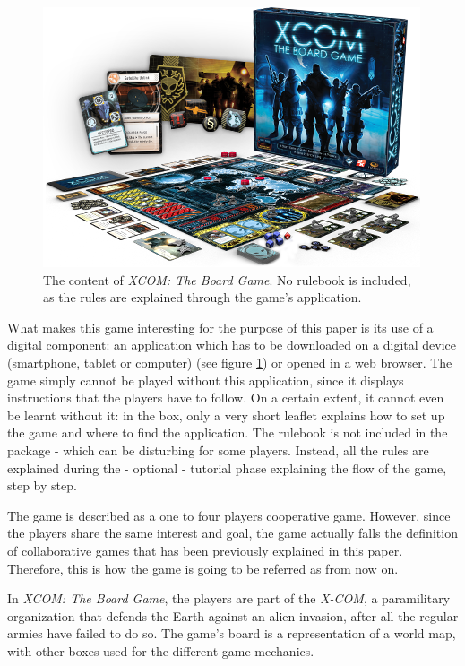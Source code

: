\begin{figure}[!ht]
    \centering
    \includegraphics[scale=0.5]{Images/xc01_layout.png}
    \caption{The content of \textit{XCOM: The Board Game}. No rulebook is included, as the rules are explained through the game's application.}
    \label{fig:XCOMBG}
\end{figure}

What makes this game interesting for the purpose of this paper is its use of a digital component: an application which has to be downloaded on a digital device (smartphone, tablet or computer) (see figure \ref{fig:XCOMBG}) or opened in a web browser. The game simply cannot be played without this application, since it displays instructions that the players have to follow. On a certain extent, it cannot even be learnt without it: in the box, only a very short leaflet explains how to set up the game and where to find the application. The rulebook is not included in the package - which can be disturbing for some players. Instead, all the rules are explained during the - optional - tutorial phase explaining the flow of the game, step by step. 

The game is described as a one to four players cooperative game. However, since the players share the same interest and goal, the game actually falls the definition of collaborative games that has been previously explained in this paper. Therefore, this is how the game is going to be referred as from now on.

In \textit{XCOM: The Board Game}, the players are part of the \textit{X-COM}, a paramilitary organization that defends the Earth against an alien invasion, after all the regular armies have failed to do so. The game's board is a representation of a world map, with other boxes used for the different game mechanics.

